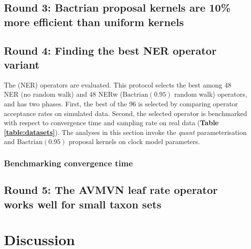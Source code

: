 \documentclass[10pt,letterpaper]{article}
\begin{document}



\subsection*{Round 3: Bactrian proposal kernels are 10\% more efficient than uniform kernels}



\subsection*{Round 4: Finding the best NER operator variant}

The \textbf{} (NER) operators are evaluated. This protocol selects the best among 48 NER (no random walk) and 48 NERw ($\text{Bactrian}(0.95)$ random walk) operators, and has two phases. First, the best of the 96 is selected by comparing operator acceptance rates on simulated data. Second, the selected operator is benchmarked with respect to convergence time and sampling rate on real data (\textbf{Table \ref{table:datasets}}). The analyses in this section invoke the \textit{quant} parameterisation and $\text{Bactrian}(0.95)$ proposal kernels on clock model parameters.







\subsubsection*{Benchmarking convergence time}




\subsection*{Round 5: The AVMVN leaf rate operator works well for small taxon sets}





\section*{Discussion} \label{sect:discussion}
\end{document}
